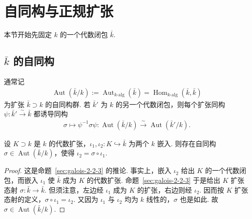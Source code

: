 \section{自同构与正规扩张}\label{sec:galois-2-3}
本节开始先固定 $k$ 的一个代数闭包 $\bar k$.
\subsection{$\bar k$ 的自同构}\label{sec:galois-2-3-1}
通常记
\begin{align*}
\operatorname{Aut}(\bar k/k):=\operatorname{Aut}_{k\text{-alg}}(\bar k)=\operatorname{Hom}_{k\text{-alg}}(\bar k,\bar k)
\end{align*}
为扩张 $\bar k\supset k$ 的自同构群. 若 $\bar k'$ 为 $k$ 的另一个代数闭包，则每个扩张同构 $\psi:\bar k'\xrightarrow{\sim}\bar k$ 都诱导同构
\begin{align*}
\sigma\longmapsto\psi^{-1}\sigma\psi:\operatorname{Aut}(\bar k/k)\xrightarrow{\sim}\operatorname{Aut}(\bar k'/k).
\end{align*}
\begin{lemma*}
设 $K\supset k$ 是 $k$ 的代数扩张，$\iota_1,\iota_2:K\hookrightarrow\bar k$ 为两个 $k$ 嵌入. 则存在自同构 $\sigma\in\operatorname{Aut}(\bar k/k)$，使得 $\iota_2=\sigma\circ\iota_1$.
\end{lemma*}
\begin{proof}
这是命题~\ref{sec:galois-2-2-3} 的推论. 事实上，嵌入 $\iota_2$ 给出 $K$ 的一个代数闭包，而嵌入 $\iota_1$ 使 $\bar k$ 成为 $K$ 的代数扩张. 命题~\ref{sec:galois-2-2-3} 于是给出 $K$ 扩张态射 $\sigma:\bar k\to\bar k$. 但须注意，左边经 $\iota_1$ 成为 $K$ 的扩张，右边则经 $\iota_2$. 因而按 $K$ 扩张态射的定义，$\sigma\circ\iota_1=\iota_2$. 又因为 $\iota_1$ 与 $\iota_2$ 均为 $k$ 线性的，$\sigma$ 也是如此. 故 $\sigma\in\operatorname{Aut}(\bar k/k)$.
\end{proof}
